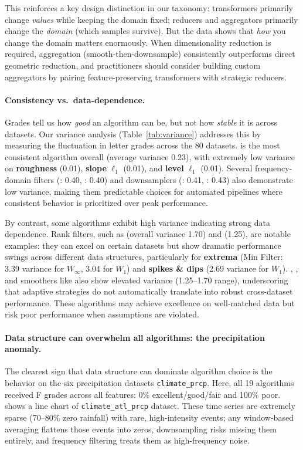This reinforces a key design distinction in our taxonomy: transformers primarily change \emph{values} while keeping the domain fixed; reducers and aggregators primarily change the \emph{domain} (which samples survive). But the data shows that \emph{how} you change the domain matters enormously. When dimensionality reduction is required, aggregation (smooth-then-downsample) consistently outperforms direct geometric reduction, and practitioners should consider building custom aggregators by pairing feature-preserving transformers with strategic reducers.


\paragraph{\textbf{Consistency vs.\ data-dependence.}}
Grades tell us how \emph{good} an algorithm can be, but not how \emph{stable} it is across datasets. Our variance analysis (Table~\ref{tab:variance}) addresses this by measuring the fluctuation in letter grades across the 80 datasets. \methodDP is the most consistent algorithm overall (average variance 0.23), with extremely low variance on \textbf{roughness} (0.01), \textbf{slope} $\ell_1$ (0.01), and \textbf{level} $\ell_1$ (0.01). Several frequency-domain filters (\methodCheb: 0.40, \methodEllips: 0.40) and downsamplers (\methodLTTB: 0.41, \methodMinMaxLTTB: 0.43) also demonstrate low variance, making them predictable choices for automated pipelines where consistent behavior is prioritized over peak performance.

By contrast, some algorithms exhibit high variance indicating strong data dependence. Rank filters, such as \methodMin (overall variance 1.70) and \methodMax (1.25), are notable examples: they can excel on certain datasets but show dramatic performance swings across different data structures, particularly for \textbf{extrema} (Min Filter: 3.39 variance for $W_\infty$, 3.04 for $W_1$) and \textbf{spikes \& dips} (2.69 variance for $W_1$). \methodFPCS, \methodASAP, and smoothers like \methodMedian also show elevated variance (1.25--1.70 range), underscoring that adaptive strategies do not automatically translate into robust cross-dataset performance. These algorithms may achieve excellence on well-matched data but risk poor performance when assumptions are violated.

\paragraph{\textbf{Data structure can overwhelm all algorithms: the precipitation anomaly.}}
The clearest sign that data structure can dominate algorithm choice is the behavior on the six precipitation datasets \texttt{climate\_prcp}. Here, all 19 algorithms received F grades across all features: 0\% excellent/good/fair and 100\% poor.~ shows a line chart of \texttt{climate\_atl\_prcp} dataset. These time series are extremely sparse (70--80\% zero rainfall) with rare, high-intensity events; any window-based averaging flattens those events into zeros, downsampling risks missing them entirely, and frequency filtering treats them as high-frequency noise.

